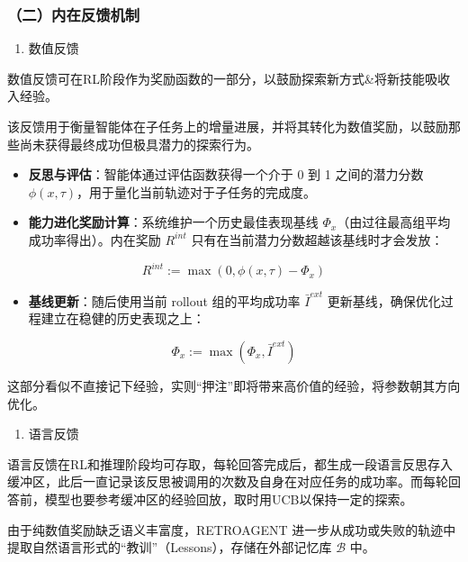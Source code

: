 \hypertarget{ux4e8cux5185ux5728ux53cdux9988ux673aux5236}{%
\subsubsection{（二）内在反馈机制}\label{ux4e8cux5185ux5728ux53cdux9988ux673aux5236}}

\begin{enumerate}
\def\labelenumi{\arabic{enumi}.}
\tightlist
\item
  数值反馈
\end{enumerate}

数值反馈可在RL阶段作为奖励函数的一部分，以鼓励探索新方式\&将新技能吸收入经验。

该反馈用于衡量智能体在子任务上的增量进展，并将其转化为数值奖励，以鼓励那些尚未获得最终成功但极具潜力的探索行为。

\begin{itemize}
\tightlist
\item
  \textbf{反思与评估}：智能体通过评估函数获得一个介于 0 到 1 之间的潜力分数 \(\phi(x,\tau)\)，用于量化当前轨迹对于子任务的完成度。
\item
  \textbf{能力进化奖励计算}：系统维护一个历史最佳表现基线 \(\Phi_x\)（由过往最高组平均成功率得出）。内在奖励 \(R^{int}\) 只有在当前潜力分数超越该基线时才会发放：
\end{itemize}

\[
R^{int} := \max(0,\phi(x,\tau)-\Phi_x)
\]

\begin{itemize}
\tightlist
\item
  \textbf{基线更新}：随后使用当前 rollout 组的平均成功率 \(\bar{I}^{ext}\) 更新基线，确保优化过程建立在稳健的历史表现之上：
\end{itemize}

\[
\Phi_x := \max(\Phi_x,\bar{I}^{ext})
\]

这部分看似不直接记下经验，实则``押注''即将带来高价值的经验，将参数朝其方向优化。

\begin{enumerate}
\def\labelenumi{\arabic{enumi}.}
\setcounter{enumi}{1}
\tightlist
\item
  语言反馈
\end{enumerate}

语言反馈在RL和推理阶段均可存取，每轮回答完成后，都生成一段语言反思存入缓冲区，此后一直记录该反思被调用的次数及自身在对应任务的成功率。而每轮回答前，模型也要参考缓冲区的经验回放，取时用UCB以保持一定的探索。

由于纯数值奖励缺乏语义丰富度，RETROAGENT 进一步从成功或失败的轨迹中提取自然语言形式的``教训''（Lessons），存储在外部记忆库 \(\mathcal{B}\) 中。

